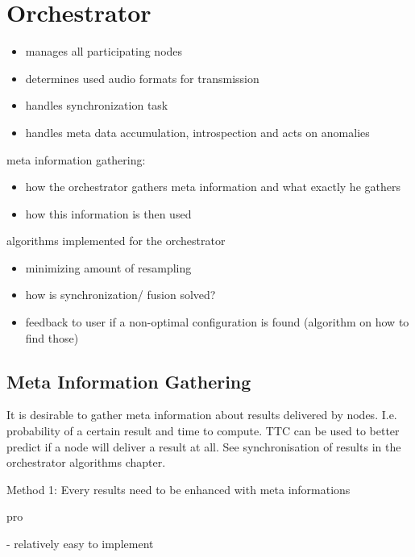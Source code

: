 


\section{Orchestrator}

\begin{itemize}
	\item manages all participating nodes
	\item determines used audio formats for transmission
	\item handles synchronization task
	\item handles meta data accumulation, introspection and acts on anomalies
\end{itemize}

meta information gathering:

\begin{itemize}
	\item how the orchestrator gathers meta information and what exactly he gathers
	\item how this information is then used
\end{itemize}

algorithms implemented for the orchestrator

\begin{itemize}
	\item minimizing amount of resampling
	\item how is synchronization/ fusion solved?
	\item feedback to user if a non-optimal configuration is found (algorithm on how to find those)
\end{itemize}

\subsection{Meta Information Gathering}
It is desirable to gather meta information about results delivered by nodes. I.e. probability of a certain result and time to compute. TTC can be used to better predict if a node will deliver a result at all. See synchronisation of results in the orchestrator algorithms chapter.

Method 1: Every results need to be enhanced with meta informations

pro

- relatively easy to implement

